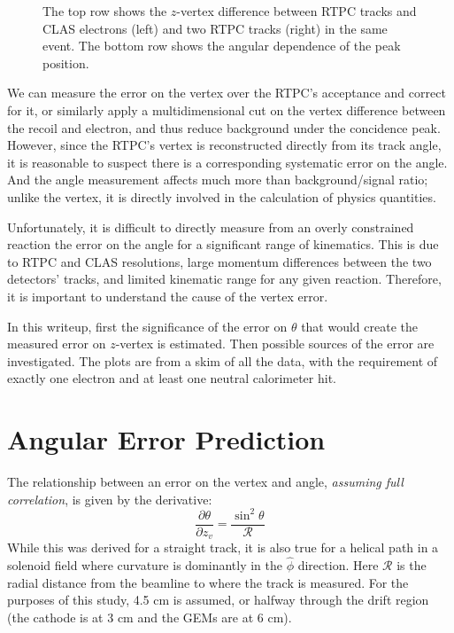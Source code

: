 \documentclass[amsmath,amssymb,notitlepage,11pt]{revtex4-1}
\begin{document}
\begin{figure}[htbp]
    \caption{
    The top row shows the $z$-vertex difference between RTPC tracks and CLAS electrons (left) and two RTPC tracks (right) in the same event.
    The bottom row shows the angular dependence of the peak position.\label{fig:dzclasrtpc}
    }
\end{figure}

We can measure the error on the vertex over the RTPC's acceptance and correct for it, or similarly apply a multidimensional cut on the vertex difference between the recoil and electron, and thus reduce background under the concidence peak.
However, since the RTPC's vertex is reconstructed directly from its track angle, it is reasonable to suspect there is a corresponding systematic error on the angle.  And the angle measurement affects much more than background/signal ratio; unlike the vertex, it is directly involved in the calculation of physics quantities.

Unfortunately, it is difficult to directly measure from an overly constrained reaction the error on the angle for a significant range of kinematics.  This is due to RTPC and CLAS resolutions, large momentum differences between the two detectors' tracks, and limited kinematic range for any given reaction.  Therefore, it is important to understand the cause of the vertex error.

In this writeup, first the significance of the error on $\theta$ that would create the measured error on $z$-vertex is estimated.  Then possible sources of the error are investigated.
The plots are from a skim of all the data, with the requirement of exactly one electron and at least one neutral calorimeter hit.

\section{Angular Error Prediction}
The relationship between an error on the vertex and angle, {\it assuming full correlation}, is given by the derivative:
\begin{equation}
    \frac{\partial\theta}{\partial z_v} = \frac{\sin^2\theta}{\mathcal{R}}
    \label{eq:dthetadz}
\end{equation}
While this was derived for a straight track, it is also true for a helical path in a solenoid field where curvature is dominantly in the $\hat{\phi}$ direction.
Here $\mathcal{R}$ is the radial distance from the beamline to where the track is measured.
For the purposes of this study, 4.5 cm is assumed, or halfway through the drift region (the cathode is at 3 cm and the GEMs are at 6 cm).
\end{document}
